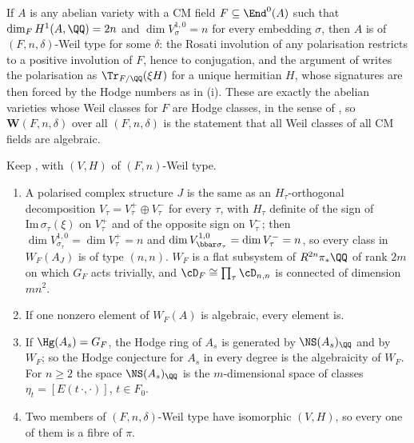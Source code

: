 \begin{remark}\label{rem:cmmember}
If $A$ is any abelian variety with a CM field $F\subseteq\End^{0}(A)$ such
that $\dim_{F}H^{1}(A,\QQ)=2n$ and $\dim V_{\sigma}^{1,0}=n$ for every
embedding $\sigma$, then $A$ is of $(F,n,\delta)$-Weil type for some
$\delta$: the Rosati involution of any polarisation restricts to a positive
involution of $F$, hence to conjugation, and the argument of
 writes the polarisation as $\Tr_{F/\QQ}(\xi H)$ for a
unique hermitian $H$, whose signatures are then forced by the Hodge numbers
as in (i). These are exactly the abelian varieties whose
Weil classes for $F$ are Hodge classes, in the sense of \cite{MZ99}, so
$\mathbf{W}(F,n,\delta)$ over all $(F,n,\delta)$ is the statement that all
Weil classes of all CM fields are algebraic.
\end{remark}

\begin{proposition}\label{prop:cmweil}
Keep , with $(V,H)$ of $(F,n)$-Weil type.
\begin{enumerate}[label=\textup{(\roman*)},leftmargin=2.6em,itemsep=2pt]
\item A polarised complex structure $J$ is the same as an $H_{\tau}$-orthogonal
  decomposition $V_{\tau}=V_{\tau}^{+}\oplus V_{\tau}^{-}$ for every $\tau$,
  with $H_{\tau}$ definite of the sign of $\mathrm{Im}\,\sigma_{\tau}(\xi)$ on
  $V_{\tau}^{+}$ and of the opposite sign on $V_{\tau}^{-}$; then
  $\dim V^{1,0}_{\sigma_{\tau}}=\dim V_{\tau}^{+}=n$ and
  $\dim V^{1,0}_{\bbar\sigma_{\tau}}=\dim V_{\tau}^{-}=n$, so every class in
  $W_{F}(A_{J})$ is of type $(n,n)$. $W_{F}$ is a flat subsystem of
  $R^{2n}\pi_{*}\QQ$ of rank $2m$ on which $G_{F}$ acts trivially, and
  $\cD_{F}\cong\prod_{\tau}\cD_{n,n}$ is connected of dimension $mn^{2}$.
\item If one nonzero element of $W_{F}(A)$ is algebraic, every element is.
\item If $\Hg(A_{s})=G_{F}$, the Hodge ring of $A_{s}$ is generated by
  $\NS(A_{s})_{\QQ}$ and by $W_{F}$; so the Hodge conjecture for $A_{s}$ in
  every degree is the algebraicity of $W_{F}$. For $n\ge2$ the space
  $\NS(A_{s})_{\QQ}$ is the $m$-dimensional space of classes
  $\eta_{t}=[E(t\,\cdot,\cdot)]$, $t\in F_{0}$.
\item Two members of $(F,n,\delta)$-Weil type have isomorphic $(V,H)$, so
  every one of them is a fibre of $\pi$.
\end{enumerate}
\end{proposition}

